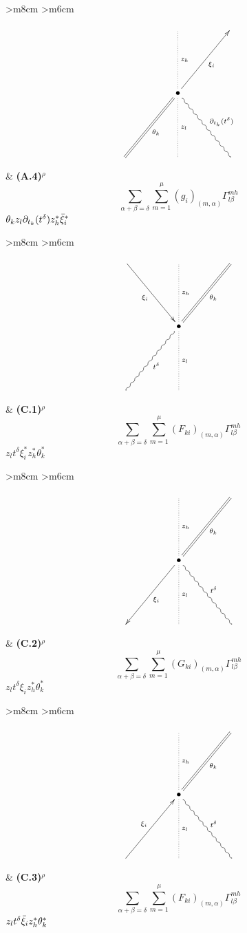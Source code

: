 \documentclass[english,letter paper,12pt,leqno]{article}
\theoremstyle{example}
\numberwithin{equation}{section}
\begin{document}
\begin{center}
\begin{tabular}{ >{\centering}m{8cm} >{\centering}m{6cm} }
\[
\xymatrix@C+2pc@R+3pc{
& \ar@{.}[d]^-{z_h} &\\
& \bullet \ar[ur]_-{\xi_i} \ar@{=}[dl]^-{\theta_k} \ar@{.}[d]^-{z_l} \ar@{~}[dr]^-{\partial_{t_k}(t^\delta)}\\
& &
}
\]
&
\textbf{(A.4)${}^\rho$}
\vspace{1cm}
\[ \sum_{\alpha + \beta = \delta } \sum_{m=1}^\mu (g_i)_{(m,\alpha)} \Gamma^{mh}_{l\beta} \]
\vspace{0.5cm}
$\theta_k z_l \partial_{t_k}(t^\delta) z_h^* \Bar{\xi}_i^*$
\end{tabular}
\end{center}

\begin{center}
\begin{tabular}{ >{\centering}m{8cm} >{\centering}m{6cm} }
\[
\xymatrix@C+2pc@R+3pc{
\ar[dr]_-{\xi_i} & \ar@{.}[d]^-{z_h} & \ar@{=}[dl]^-{\theta_k}\\
& \bullet \ar@{.}[d]^-{z_l} \ar@{~}[dl]^-{t^\delta}\\
& &
}
\]
&
\textbf{(C.1)${}^\rho$}
\vspace{1cm}
\[\sum_{\alpha + \beta = \delta } \sum_{m=1}^\mu (F_{ki})_{(m,\alpha)} \Gamma^{m h}_{l \beta}\]
\vspace{0.5cm}
$z_{l} t^\delta \xi_i^* z_h^* \theta_k^*$
\end{tabular}
\end{center}

\begin{center}
\begin{tabular}{ >{\centering}m{8cm} >{\centering}m{6cm} }
\[
\xymatrix@C+2pc@R+3pc{
& \ar@{.}[d]^-{z_h} & \ar@{=}[dl]^-{\theta_k} \\
& \bullet \ar[dl]^-{\xi_i}\ar@{.}[d]^-{z_l} \ar@{~}[dr]^-{t^\delta}\\
& &
}
\]
&
\textbf{(C.2)${}^\rho$}
\vspace{1cm}
\[\sum_{\alpha + \beta = \delta } \sum_{m=1}^\mu (G_{ki})_{(m,\alpha)} \Gamma^{m h}_{l \beta}\]
\vspace{0.5cm}
$z_{l} t^\delta \xi_i z_h^* \theta_k^*$
\end{tabular}
\end{center}

\begin{center}
\begin{tabular}{ >{\centering}m{8cm} >{\centering}m{6cm} }
\[
\xymatrix@C+2pc@R+3pc{
& \ar@{.}[d]^-{z_h} & \ar@{=}[dl]^-{\theta_k} \\
& \bullet \ar@{.}[d]^-{z_l} \ar@{~}[dr]^-{t^\delta}\\
\ar[ur]^-{\xi_i} & &
}
\]
&
\textbf{(C.3)${}^\rho$}
\vspace{1cm}
\[\sum_{\alpha + \beta = \delta } \sum_{m=1}^\mu (F_{ki})_{(m,\alpha)} \Gamma^{m h}_{l \beta}\]
\vspace{0.5cm}
$z_{l} t^\delta \Bar{\xi}_i z_h^* \theta_k^*$
\end{tabular}
\end{center}
\end{document}
